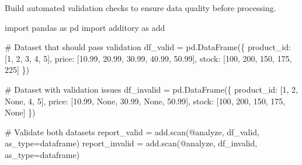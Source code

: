 \documentclass[
  letterpaper,
]{scrbook}
\newenvironment{Shaded}{\begin{snugshade}}{\end{snugshade}}
\newcommand{\CommentTok}[1]{\textcolor[rgb]{0.37,0.37,0.37}{#1}}
\newcommand{\DecValTok}[1]{\textcolor[rgb]{0.68,0.00,0.00}{#1}}
\newcommand{\FloatTok}[1]{\textcolor[rgb]{0.68,0.00,0.00}{#1}}
\newcommand{\ImportTok}[1]{\textcolor[rgb]{0.00,0.46,0.62}{#1}}
\newcommand{\NormalTok}[1]{\textcolor[rgb]{0.00,0.23,0.31}{#1}}
\newcommand{\OperatorTok}[1]{\textcolor[rgb]{0.37,0.37,0.37}{#1}}
\newcommand{\StringTok}[1]{\textcolor[rgb]{0.13,0.47,0.30}{#1}}
\newcommand{\VariableTok}[1]{\textcolor[rgb]{0.07,0.07,0.07}{#1}}
\begin{document}
Build automated validation checks to ensure data quality before
processing.

\begin{Shaded}
\begin{Highlighting}[]
\ImportTok{import}\NormalTok{ pandas }\ImportTok{as}\NormalTok{ pd}
\ImportTok{import}\NormalTok{ additory }\ImportTok{as}\NormalTok{ add}

\CommentTok{\# Dataset that should pass validation}
\NormalTok{df\_valid }\OperatorTok{=}\NormalTok{ pd.DataFrame(\{}
    \StringTok{\textquotesingle{}product\_id\textquotesingle{}}\NormalTok{: [}\DecValTok{1}\NormalTok{, }\DecValTok{2}\NormalTok{, }\DecValTok{3}\NormalTok{, }\DecValTok{4}\NormalTok{, }\DecValTok{5}\NormalTok{],}
    \StringTok{\textquotesingle{}price\textquotesingle{}}\NormalTok{: [}\FloatTok{10.99}\NormalTok{, }\FloatTok{20.99}\NormalTok{, }\FloatTok{30.99}\NormalTok{, }\FloatTok{40.99}\NormalTok{, }\FloatTok{50.99}\NormalTok{],}
    \StringTok{\textquotesingle{}stock\textquotesingle{}}\NormalTok{: [}\DecValTok{100}\NormalTok{, }\DecValTok{200}\NormalTok{, }\DecValTok{150}\NormalTok{, }\DecValTok{175}\NormalTok{, }\DecValTok{225}\NormalTok{]}
\NormalTok{\})}

\CommentTok{\# Dataset with validation issues}
\NormalTok{df\_invalid }\OperatorTok{=}\NormalTok{ pd.DataFrame(\{}
    \StringTok{\textquotesingle{}product\_id\textquotesingle{}}\NormalTok{: [}\DecValTok{1}\NormalTok{, }\DecValTok{2}\NormalTok{, }\VariableTok{None}\NormalTok{, }\DecValTok{4}\NormalTok{, }\DecValTok{5}\NormalTok{],}
    \StringTok{\textquotesingle{}price\textquotesingle{}}\NormalTok{: [}\FloatTok{10.99}\NormalTok{, }\VariableTok{None}\NormalTok{, }\FloatTok{30.99}\NormalTok{, }\VariableTok{None}\NormalTok{, }\FloatTok{50.99}\NormalTok{],}
    \StringTok{\textquotesingle{}stock\textquotesingle{}}\NormalTok{: [}\DecValTok{100}\NormalTok{, }\DecValTok{200}\NormalTok{, }\DecValTok{150}\NormalTok{, }\DecValTok{175}\NormalTok{, }\VariableTok{None}\NormalTok{]}
\NormalTok{\})}

\CommentTok{\# Validate both datasets}
\NormalTok{report\_valid }\OperatorTok{=}\NormalTok{ add.scan(}\StringTok{\textquotesingle{}@analyze\textquotesingle{}}\NormalTok{, df\_valid, as\_type}\OperatorTok{=}\StringTok{\textquotesingle{}dataframe\textquotesingle{}}\NormalTok{)}
\NormalTok{report\_invalid }\OperatorTok{=}\NormalTok{ add.scan(}\StringTok{\textquotesingle{}@analyze\textquotesingle{}}\NormalTok{, df\_invalid, as\_type}\OperatorTok{=}\StringTok{\textquotesingle{}dataframe\textquotesingle{}}\NormalTok{)}


\end{Highlighting}
\end{Shaded}
\end{document}
